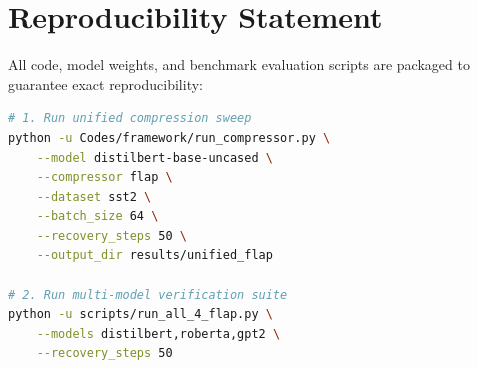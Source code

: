 \section{Reproducibility Statement}
All code, model weights, and benchmark evaluation scripts are packaged to guarantee exact reproducibility:
\begin{lstlisting}[language=bash]
# 1. Run unified compression sweep
python -u Codes/framework/run_compressor.py \
    --model distilbert-base-uncased \
    --compressor flap \
    --dataset sst2 \
    --batch_size 64 \
    --recovery_steps 50 \
    --output_dir results/unified_flap

# 2. Run multi-model verification suite
python -u scripts/run_all_4_flap.py \
    --models distilbert,roberta,gpt2 \
    --recovery_steps 50
\end{lstlisting}
